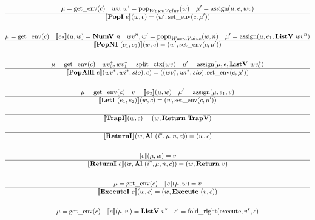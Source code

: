 \begin{gather*}
  \mu = \getenv(c) \quad
  wv, w' = \pop_{WasmValue}(w) \quad
  \mu' = \assign(\mu, e, wv) \\
  \hline
  \sem{\popi ~ e}(w, c) = (w', \setenv(c, \mu')) \\
%
\newline \\
  \mu = \getenv(c) \quad
  \sem{e_2}(\mu, w) = \numv ~ n \quad
  wv^n, w' = \popn_{WasmValue}(w, n) \quad
  \mu' = \assign(\mu, e_1, \listv ~ wv^n) \\
  \hline
  \sem{\popni ~ (e_1, e_2)}(w, c) = (w', \setenv(c, \mu')) \\
%
\newline \\
  \mu = \getenv(c) \quad
  \seq{wv_0}, \seq{wv_1} = \splitctx(wv) \quad
  \mu' = \assign(\mu, e, \listv ~ \seq{wv_0}) \\
  \hline
  \sem{\popalli ~ e}(\seq{wv}, \seq{wi}, sto), c)
  =
  ((\seq{wv_1}, \seq{wi}, sto), \setenv(c, \mu')) \\
%
\newline \\
  \mu = \getenv(c) \quad
  v = \sem{e_2}(\mu, w) \quad
  \mu' = \assign(\mu, e_1, v) \\
  \hline
  \sem{\leti ~ (e_1, e_2)}(w, c)
  =
  (w, \setenv(c, \mu')) \\
%
\newline \\
  \hline
  \sem{\trapi}(w, c) = (w, \ret ~ \trapv) \\
%
\newline \\
  \hline
  \sem{\returni}(w, \al~ (\seq{i}, \mu, n, c)) = (w, c) \\
%
\newline \\
  \sem{e}(\mu, w) = v \\
  \hline
  \sem{\returni ~ e}(w, \al ~ (\seq{i}, \mu, n, c)) = (w, \ret ~ v) \\
%
\newline \\
  \mu = \getenv(c) \quad
  \sem{e}(\mu, w) = v \\
  \hline
  \sem{\executei ~ e}(w, c) = (w, \exe ~ (v, c)) \\
%
\newline \\
  \mu = \getenv(c) \quad
  \sem{e}(\mu, w) = \listv ~ \seq v \quad
  c' = \foldright(\execute, \seq v, c) \\

\end{gather*}
